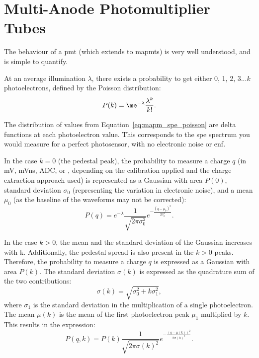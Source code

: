 \section{Multi-Anode Photomultiplier Tubes}

The behaviour of a \gls{pmt} (which extends to \glspl{mapmt}) is very well understood, and is simple to quantify. 

At an average illumination $\lambda$, there exists a probability to get either 0, 1, 2, 3...$k$ photoelectrons, defined by the Poisson distribution:
\begin{equation} \label{eq:mapm_spe_poisson}
P(k) = \me^{-\lambda} \frac{\lambda^k}{k!}.
\end{equation}

The distribution of values from Equation~\ref{eq:mapm_spe_poisson} are delta functions at each photoelectron value. This corresponds to the \gls{spe} spectrum you would measure for a perfect photosensor, with no electronic noise or \gls{enf}. 

In the case $k = 0$ (the pedestal peak), the probability to measure a charge $q$ (in \si{mV}, \si{mVns}, \si{ADC}, or \si{\pe}, depending on the calibration applied and the charge extraction approach used) is represented as a Gaussian with area $P(0)$, standard deviation $\sigma_0$ (representing the variation in electronic noise), and a mean $\mu_0$ (as the baseline of the waveforms may not be corrected):
\begin{equation} \label{eq:mapm_spe_ped}
P(q) = e^{-\lambda} \frac{1}{\sqrt{2 \pi \sigma_0^2}} e^{-\frac{(q - \mu_0)^2}{2 \sigma_0^2}}.
\end{equation}

In the case $k > 0$, the mean and the standard deviation of the Gaussian increases with k. Additionally, the pedestal spread is also present in the $k > 0$ peaks. Therefore, the probability to measure a charge $q$ is expressed as a Gaussian with area $P(k)$. The standard deviation $\sigma(k)$ is expressed as the quadrature sum of the two contributions:
\begin{equation}
\sigma(k) = \sqrt{\sigma_0^2 + k \sigma_1^2},
\end{equation}
where $\sigma_1$ is the standard deviation in the multiplication of a single photoelectron.
The mean $\mu(k)$ is the mean of the first photoelectron peak $\mu_1$ multiplied by $k$. This results in the expression:
\begin{equation}
P(q, k) = P(k) \frac{1}{\sqrt{2 \pi \sigma(k)^2}} e^{-\frac{(q - \mu(k))^2}{2 \sigma(k)^2}}.
\end{equation}

